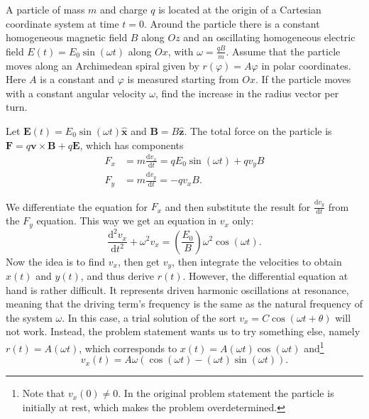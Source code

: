 \documentclass[../TST.tex]{subfiles}
\begin{document}
\begin{pproblem}
A particle of mass $m$ and charge $q$ is located at the origin of a Cartesian coordinate system at time $t=0$. Around the particle there is a constant homogeneous magnetic field $B$ along $Oz$ and an oscillating homogeneous electric field  $E(t)=E_0\sin(\omega t)$ along $Ox$, with $\omega=\frac{qB}{m}$. Assume that the particle moves along an Archimedean spiral given by $r(\varphi)=A\varphi$ in polar coordinates. Here $A$ is a constant and $\varphi$ is measured starting from $Ox$. If the particle moves with a constant angular velocity $\omega$, find the increase in the radius vector per turn.
\end{pproblem}

\ifprob \else
	\begin{solution} Let $\mathbf{E}(t)=E_0 \sin{(\omega t)}\hat{\mathbf{x}}$ and $\mathbf{B}=B \hat{\mathbf{z}}$. The total force on the particle is $\mathbf{F}= q\mathbf{v}\times \mathbf{B}+q\mathbf{E}$, which has components
	\begin{align*}
		F_x &= m \frac{\mathrm{d}v_x}{\mathrm{d}t}=qE_0\sin{(\omega t)}+qv_yB\\
		F_y &= m \frac{\mathrm{d}v_y}{\mathrm{d}t}=-qv_xB.
	\end{align*}
\end{solution}
We differentiate the equation for $F_x$ and then substitute the result for $\frac{\mathrm{d}v_y}{\mathrm{d}t}$ from the $F_y$ equation. This way we get an equation in $v_x$ only:
\begin{equation*}
	\frac{\mathrm{d}^2v_x}{\mathrm{d}{t}^2}+\omega^2v_x=\left(\frac{E_0}{B}\right) \omega^2 \cos{(\omega t)} .
\end{equation*}
Now the idea is to find $v_x$, then get $v_y$, then integrate the velocities to obtain $x(t)$ and $y(t)$, and thus derive $r(t)$. However, the differential equation at hand is rather difficult. It represents driven harmonic oscillations at resonance, meaning that the driving term's frequency is the same as the natural frequency of the system $\omega$. In this case, a trial solution of the sort $v_x=C\cos{(\omega t+\theta)}$ will not work. Instead, the problem statement wants us to try something else, namely $r(t)=A(\omega t)$, which corresponds to $x(t)=A(\omega t)\cos{(\omega t)}$ and\footnote{Note that $v_x(0)\neq 0$. In the original problem statement the particle is initially at rest, which makes the problem overdetermined.}
\begin{equation*}
v_x(t)=A\omega(\cos{(\omega t)}-(\omega t)\sin{(\omega t)}).
\end{equation*}
\end{document}
